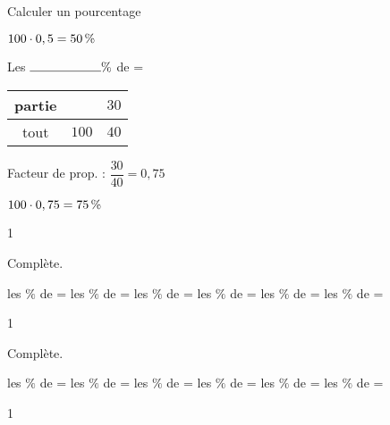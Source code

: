 \documentclass[a4paper,11pt]{report}
\begin{document}
\begin{resolu}{Calculer un pourcentage}
{\begin{tasks}
\begin{minipage}[]{0.7\textwidth}
        $100\cdot0,5=\tunit{50}{\%}$
     \end{minipage}
    
    \task Les $\ligne{2}\%$ de  = 
    
    \begin{minipage}[]{0.3\textwidth}
     \begin{tabular}{|c|c|c|}
         \hline
         partie &  & $30$ \\ \hline
         tout & $100$ & $40$ \\ \hline
     \end{tabular}
     \end{minipage}
     \begin{minipage}[]{0.7\textwidth}
     Facteur de prop. : $\dfrac{30}{40}=0,75$
     
        $100\cdot0,75=\tunit{75}{\%}$
     \end{minipage}
    
\end{tasks}
}{1}    
\end{resolu}

\begin{exo}{
    Complète.
    \begin{tasks}
        \task les $\%$ de  = 
        \task les $\%$ de  = 
        \task les $\%$ de  = 
        \task les $\%$ de  = 
        \task les $\%$ de  = 
        \task les $\%$ de  = 
    \end{tasks}
}{1}    
\end{exo}


\begin{exo}{
    Complète.
    \begin{tasks}
        \task les $\%$ de  =  %
        \task les $\%$ de  =  %
        \task les $\%$ de  =  %
        \task les $\%$ de  =  %
        \task les $\%$ de  =  %
        \task les $\%$ de  =  %
    \end{tasks}
}{1}    
\end{exo}
\end{document}
